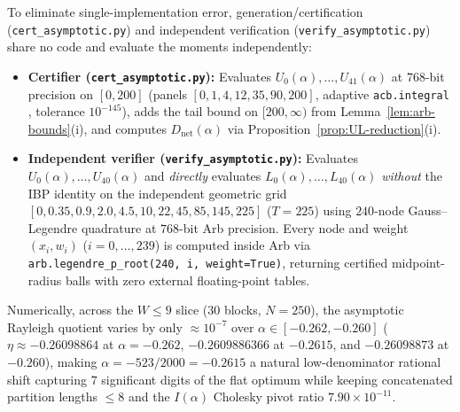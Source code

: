 \documentclass[11pt, reqno]{amsart}
\theoremstyle{remark}
\numberwithin{equation}{section}
\begin{document}
To eliminate single-implementation error, generation/certification (\texttt{cert\_asymptotic.py})
and independent verification (\texttt{verify\_asymptotic.py}) share no code and evaluate the
moments independently:
\begin{itemize}
\item \textbf{Certifier (\texttt{cert\_asymptotic.py}):} Evaluates $U_0(\alpha),\dots,U_{41}(\alpha)$
at $768$-bit precision on $[0, 200]$ (panels $[0,1,4,12,35,90,200]$, adaptive \texttt{acb.integral}
\cite{JohanssonArb}, tolerance $10^{-145}$), adds the tail bound on $[200,\infty)$ from Lemma~\ref{lem:arb-bounds}(i),
and computes $D_{\mathrm{net}}(\alpha)$ via Proposition~\ref{prop:UL-reduction}(i).
\item \textbf{Independent verifier (\texttt{verify\_asymptotic.py}):} Evaluates $U_0(\alpha),\dots,U_{40}(\alpha)$
and \emph{directly} evaluates $L_0(\alpha),\dots,L_{40}(\alpha)$ \emph{without} the IBP identity on
the independent geometric grid $[0, 0.35, 0.9, 2.0, 4.5, 10, 22, 45, 85, 145, 225]$ ($T = 225$) using
$240$-node Gauss--Legendre quadrature at $768$-bit Arb precision. Every node and weight $(x_i, w_i)$
($i = 0, \dots, 239$) is computed inside Arb via \texttt{arb.legendre\_p\_root(240, i, weight=True)},
returning certified midpoint-radius balls with zero external floating-point tables.
\end{itemize}
Numerically, across the $W \le 9$ slice ($30$ blocks, $N = 250$), the asymptotic Rayleigh quotient
varies by only $\approx 10^{-7}$ over $\alpha \in [-0.262, -0.260]$ ($\eta \approx -0.26098864$ at
$\alpha = -0.262$, $-0.2609886366$ at $-0.2615$, and $-0.26098873$ at $-0.260$), making
$\alpha = -523/2000 = -0.2615$ a natural low-denominator rational shift capturing $7$ significant
digits of the flat optimum while keeping concatenated partition lengths $\le 8$ and the $I(\alpha)$
Cholesky pivot ratio $7.90 \times 10^{-11}$.
\end{document}
